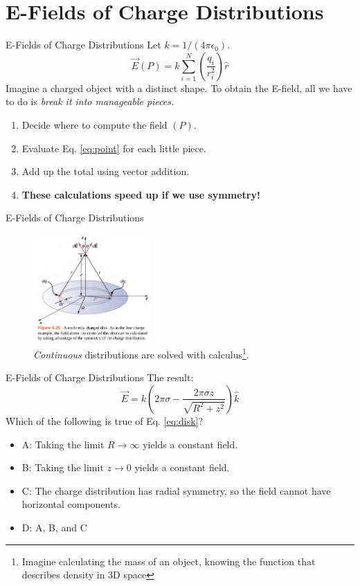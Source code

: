\documentclass{beamer}
\begin{document}
\section{E-Fields of Charge Distributions}

\begin{frame}{E-Fields of Charge Distributions}
Let $k = 1/(4\pi\epsilon_0)$.
\begin{equation}
\vec{E}(P) = k \sum_{i = 1}^N \left(\frac{q_i}{r_i^2}\right) \hat{r} \label{eq:point}
\end{equation}
Imagine a charged object with a distinct shape. To obtain the E-field, all we have to do is \textit{break it into manageable pieces.}
\begin{enumerate}
\item Decide where to compute the field $(P)$.
\item Evaluate Eq. \ref{eq:point} for each little piece.
\item Add up the total using vector addition.
\item \textbf{These calculations speed up if we use symmetry!}
\end{enumerate}
\end{frame}

\begin{frame}{E-Fields of Charge Distributions}
\small
\begin{figure}
\includegraphics[width=0.4\textwidth]{figures/disk.png}
\caption{\label{fig:disk2} \textit{Continuous} distributions are solved with calculus\footnote{Imagine calculating the mass of an object, knowing the function that describes density in 3D space}.}
\end{figure}
\end{frame}

\begin{frame}{E-Fields of Charge Distributions}
\small
The result:
\begin{equation}
\boxed{
\vec{E} = k\left(2\pi\sigma - \frac{2\pi\sigma z}{\sqrt{R^2 + z^2}} \right)\hat{k}} \label{eq:disk}
\end{equation}
Which of the following is true of Eq. \ref{eq:disk}?
\begin{itemize}
\item A: Taking the limit $R \rightarrow \infty$ yields a constant field.
\item B: Taking the limit $z \rightarrow 0$ yields a constant field.
\item C: The charge distribution has radial symmetry, so the field cannot have horizontal components.
\item D: A, B, and C
\end{itemize}
\end{frame}
\end{document}
